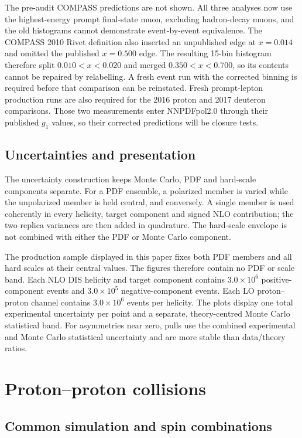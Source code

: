 \documentclass[11pt,a4paper]{article}
\begin{document}
The pre-audit COMPASS predictions are not shown.  All three analyses now use
the highest-energy prompt final-state muon, excluding hadron-decay muons, and
the old histograms cannot demonstrate event-by-event equivalence.  The
COMPASS 2010 Rivet definition also
inserted an unpublished edge at $x=0.014$ and omitted the published
$x=0.500$ edge.  The resulting 15-bin histogram therefore split
$0.010<x<0.020$ and merged $0.350<x<0.700$, so its contents cannot be
repaired by relabelling.  A fresh event run with the corrected binning is
required before that comparison can be reinstated.  Fresh prompt-lepton
production runs are also required for the 2016 proton and 2017 deuteron
comparisons.  Those two measurements enter NNPDFpol2.0 through their
published $g_1$ values, so their corrected predictions will be closure tests.

\FloatBarrier
\subsection{Uncertainties and presentation}

The uncertainty construction keeps Monte Carlo, PDF and hard-scale
components separate.  For a PDF ensemble, a polarized member is varied while
the unpolarized member is held central, and conversely.  A single member is
used coherently in every helicity, target component and signed NLO
contribution; the two replica variances are then added in quadrature.  The
hard-scale envelope is not combined with either the PDF or Monte Carlo
component.

The production sample displayed in this paper fixes both PDF members and all
hard scales at their central values.  The figures therefore contain no PDF or
scale band.  Each NLO DIS helicity and target component contains
$3.0\times10^6$ positive-component events and $3.0\times10^5$
negative-component events.  Each LO proton--proton channel contains
$3.0\times10^6$ events per helicity.  The plots display one total
experimental uncertainty per point and a separate, theory-centred Monte
Carlo statistical band.  For asymmetries near zero, pulls use the combined
experimental and Monte Carlo statistical uncertainty and are more stable
than data/theory ratios.

\FloatBarrier
\section{Proton--proton collisions}
\label{sec:pp}

\subsection{Common simulation and spin combinations}
\end{document}
